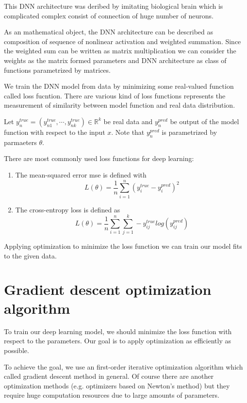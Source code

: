 \documentclass[11pt]{article}
\begin{document}
	This DNN architecture was deribed by imitating biological brain which is complicated complex consist of connection of huge number of neurons.

	As an mathematical object, the DNN architecture can be described as composition of sequence of nonlinear activation and weighted summation. Since the weighted sum can be written as matrix multiplication we can consider the weights as the matrix formed parameters and DNN architecture as class of functions parametrized by matrices.

	We train the DNN model from data by minimizing some real-valued function called loss fucntion. There are various kind of loss functions represents the measurement of similarity between model function and real data distribution.

	Let $y_n^{true}=(y_{n1}^{true},\cdots, y_{nk}^{true})\in\mathbb{R}^k$ be real data and $y_n^{pred}$ be output of the model function with respect to the input $x$. Note that $y_n^{pred}$ is parametrized by parmaeters $\theta$.

	There are most commonly used loss functions for deep learning:

	\begin{enumerate}		
		\item The mean-squared error mse is defined with
		\begin{equation*}
			L(\theta)=\frac{1}{n}\sum_{i=1}^n (y_i^{true}-y_i^{pred})^2
		\end{equation*}
		\item The cross-entropy loss is defined as
		\begin{equation*}
			L(\theta)=\frac{1}{n}\sum_{i=1}^n \sum_{j=1}^{k}-y_{ij}^{true}log (y_{ij}^{pred})
		\end{equation*}
	\end{enumerate}

	Applying optimization to minimize the loss function we can train our model fits to the given data.

	\section{Gradient descent optimization algorithm}
	To train our deep learning model, we should minimize the loss function with respect to the parameters. Our goal is to apply optimization as efficiently as possible.

	To achieve the goal, we use an first-order iterative optimization algorithm which called gradient descent method in general. Of course there are another optimization methods (e.g. optimizers based on Newton's method) but they require huge computation resources due to large amounts of parameters.
\end{document}
